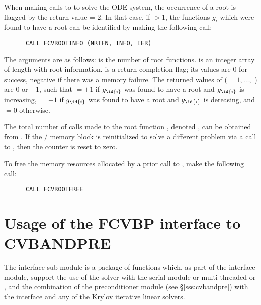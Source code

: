 When making calls to  to solve the ODE system, the occurrence of
a root is flagged by the return value  = 2.  In that case, if
 $> 1$, the functions $g_i$ which were found to have a root can
be identified by making the following call:
\begin{verbatim}
      CALL FCVROOTINFO (NRTFN, INFO, IER)
\end{verbatim}
The arguments are as follows:  is the number of root functions.
 is an integer array of length  with root information.
 is a return completion flag; its values are $0$ for success, 
negative if there was a memory failure.  The returned values of 
($ = 1,\ldots,$ ) are $0$ or $\pm 1$, such that 
 $ = +1$ if $g_{\id{i}}$ was found to have a root and $g_{\id{i}}$ is increasing,
 $ = -1$ if $g_{\id{i}}$ was found to have a root and $g_{\id{i}}$ is dereasing,
and  $ = 0$ otherwise.

The total number of calls made to the root function ,
denoted , can be obtained from .
If the {\fcvode}/{\cvode} memory block is reinitialized to solve a
different problem via a call to , then the counter
 is reset to zero.

To free the memory resources allocated by a prior call to , make
the following call:
\begin{verbatim}
      CALL FCVROOTFREE
\end{verbatim}


\section{Usage of the FCVBP interface to CVBANDPRE}
The {\fcvbp} interface sub-module is a package of {\CC} functions which,
as part of the {\fcvode} interface module, support the use of the
{\cvode} solver with the serial {\nvecs} module or multi-threaded
{\nvecopenmp} or {\nvecpthreads}, and the combination of
the {\cvbandpre} preconditioner module (see \S\ref{sss:cvbandpre}) with
the {\cvls} interface and any of the Krylov iterative linear solvers.

